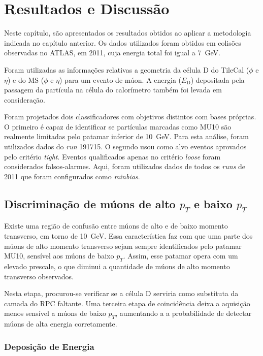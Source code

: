 
\chapter{Resultados e Discussão}

Neste capítulo, são apresentados os resultados obtidos ao aplicar a metodologia
indicada no capítulo anterior. Os dados utilizados foram obtidos em colisões
observadas no ATLAS, em 2011, cuja energia total foi igual a 7~GeV.

Foram utilizadas as informações relativas a geometria da célula D do TileCal
($\phi$ e $\eta$) e do MS ($\phi$ e $\eta$) para um evento de múon.  A energia
($E_\text{D}$) depositada pela passagem da partícula na célula do calorímetro também
foi levada em consideração.

Foram projetados dois classificadores com objetivos distintos com bases
próprias. O primeiro é capaz de identificar se partículas marcadas como MU10
são realmente limitadas pelo patamar inferior de 10~GeV. Para esta análise,
foram utilizados dados do \emph{run} 191715. O segundo usou como alvo eventos
aprovados pelo critério \emph{tight}. Eventos qualificados apenas no critério
\emph{loose} foram considerados falsos-alarmes.  Aqui, foram utilizados dados
de todos os  \emph{runs} de 2011 que foram configurados como \emph{minbias}.


\section{Discriminação de múons de alto $p_T$ e baixo $p_T$}

Existe uma região de confusão entre múons de alto e de baixo momento
transverso, em torno de 10~GeV. Essa característica faz com que uma parte dos
múons de alto momento transverso sejam sempre identificados pelo patamar MU10,
sensível aos múons de baixo $p_T$. Assim, esse patamar opera com um elevado
prescale, o que diminui a quantidade de múons de alto momento transverso
observados.

Nesta etapa, procurou-se verificar se a célula D serviria como substituta da
camada do RPC faltante. Uma terceira etapa de coincidência deixa a aquisição
menos sensível a múons de baixo $p_T$, aumentando a a probabilidade de detectar
múons de alta energia corretamente.


\subsection*{Deposição de Energia}

